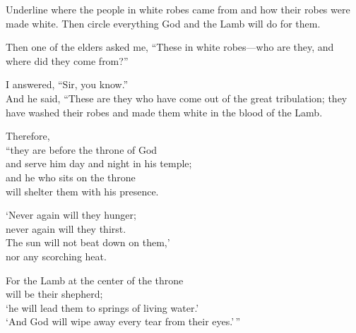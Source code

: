 \begin{ScriptureBox2}{Underline where the people in white robes came from and how their robes were made white. Then circle everything God and the Lamb will do for them.}

\item[7:13] Then one of the elders asked me, ``These in white robes---who are they, and where did they come from?''

\item[7:14] I answered, ``Sir, you know.''\\
And he said, ``These are they who have come out of the great tribulation; they have washed their robes and made them white in the blood of the Lamb.

\item[7:15] Therefore,\\
\hspace*{1em}``they are before the throne of God\\
\hspace*{2em}and serve him day and night in his temple;\\
\hspace*{1em}and he who sits on the throne\\
\hspace*{2em}will shelter them with his presence.

\item[7:16] \hspace*{1em}`Never again will they hunger;\\
\hspace*{2em}never again will they thirst.\\
\hspace*{1em}The sun will not beat down on them,'\\
\hspace*{2em}nor any scorching heat.

\item[7:17] \hspace*{1em}For the Lamb at the center of the throne\\
\hspace*{2em}will be their shepherd;\\
\hspace*{1em}`he will lead them to springs of living water.'\\
\hspace*{2em}`And God will wipe away every tear from their eyes.'\,''

\end{ScriptureBox2}

